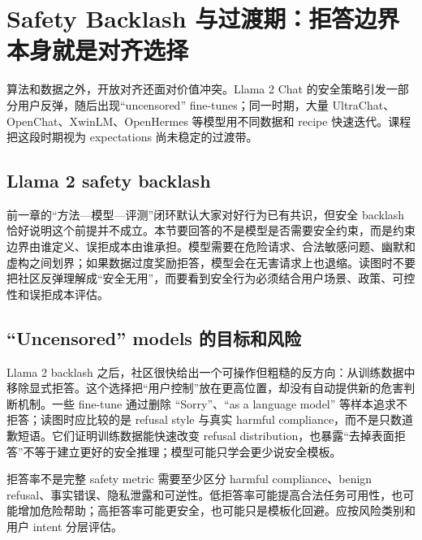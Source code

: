 \section{Safety Backlash 与过渡期：拒答边界本身就是对齐选择}

算法和数据之外，开放对齐还面对价值冲突。Llama 2 Chat 的安全策略引发一部分用户反弹，随后出现“uncensored” fine-tunes；同一时期，大量 UltraChat、OpenChat、XwinLM、OpenHermes 等模型用不同数据和 recipe 快速迭代。课程把这段时期视为 expectations 尚未稳定的过渡带。

\subsection{Llama 2 safety backlash}

前一章的“方法—模型—评测”闭环默认大家对好行为已有共识，但安全 backlash 恰好说明这个前提并不成立。本节要回答的不是模型是否需要安全约束，而是约束边界由谁定义、误拒成本由谁承担。模型需要在危险请求、合法敏感问题、幽默和虚构之间划界；如果数据过度奖励拒答，模型会在无害请求上也退缩。读图时不要把社区反弹理解成“安全无用”，而要看到安全行为必须结合用户场景、政策、可控性和误拒成本评估。



\subsection{“Uncensored” models 的目标和风险}

Llama 2 backlash 之后，社区很快给出一个可操作但粗糙的反方向：从训练数据中移除显式拒答。这个选择把“用户控制”放在更高位置，却没有自动提供新的危害判断机制。一些 fine-tune 通过删除 ``Sorry''、``as a language model'' 等样本追求不拒答；读图时应比较的是 refusal style 与真实 harmful compliance，而不是只数道歉短语。它们证明训练数据能快速改变 refusal distribution，也暴露“去掉表面拒答”不等于建立更好的安全推理；模型可能只学会更少说安全模板。


\begin{warningbox}{拒答率不是完整 safety metric}
需要至少区分 harmful compliance、benign refusal、事实错误、隐私泄露和可逆性。低拒答率可能提高合法任务可用性，也可能增加危险帮助；高拒答率可能更安全，也可能只是模板化回避。应按风险类别和用户 intent 分层评估。
\end{warningbox}

